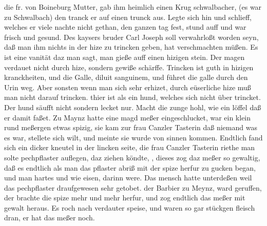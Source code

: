die fr. von Boineburg\protect{} Mutter\protect{}, gab ihm heimlich einen Krug schwalbacher, (es war zu Schwalbach\protect{}) den tranck er auf einen trunck aus. Legte sich hin und schlieff, welches er viele nachte nicht gethan, den ganzen tag fest, stund auff und war frisch und gesund. Des kaysers bruder Carl Joseph\protect{} soll verwahrlo{\ss}t worden seyn, da{\ss} man ihm nichts in der hize zu trincken geben, hat verschmachten m\"{u}{\ss}en. Es ist eine vanit\"{a}t daz man sagt, man gie{\ss}e auff einen hizigen stein. Der magen verdauet nicht durch hize, sondern gewi{\ss}e sch\"{a}rffe. Trincken ist guth in hizigen kranckheiten, und  die Galle, diluit sanguinem, und f\"{u}hret die galle durch den Urin weg. Aber sonsten wenn man sich sehr erhizet, durch e\"{u}serliche hize mu{\ss} man nicht darauf trincken.  thier ist als ein hund, welches sich nicht \"{u}ber trincket. Der hund s\"{a}ufft nicht sondern lecket nur. Macht die zunge hohl, wie ein l\"{o}ffel da{\ss} er damit fa{\ss}et.%
\pend%
\pstart%
Zu Maynz\protect{} hatte eine magd  me{\ss}er eingeschlucket, war ein klein rund me{\ss}ergen etwas spizig, sie kam zur frau Canzler Tasterin\protect{}  da{\ss}  niemand was es war, stellete sich wilt, und  meinte sie wurde von sinnen kommen. Endtlich fand sich ein dicker kneutel in der lincken seite, die frau Canzler Tasterin\protect{} riethe man solte pechpflaster auflegen, daz ziehen k\"{o}ndte, , dieses zog daz me{\ss}er so gewaltig, da{\ss} es endtlich als man das pflaster abri{\ss} mit der spize herfur zu gucken began, und man  hartes und wie eisen, darinn were. Das mensch hatte unterde{\ss}en weil das pechpflaster draufgewesen sehr getobet.  der Barbier zu Meynz, ward geruffen, der brachte die spize mehr und mehr herfur, und zog endtlich das me{\ss}er mit gewalt heraus. Es roch nach verdauter speise, und waren so gar st\"{u}ckgen fleisch dran, er hat das me{\ss}er noch.
